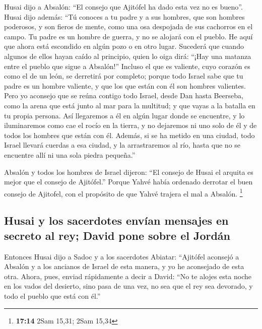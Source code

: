  Husai dijo a Absalón: ``El consejo que Ajitófel ha dado
esta vez no es bueno''.  Husai dijo además: ``Tú conoces a
tu padre y a sus hombres, que son hombres poderosos, y son fieros de
mente, como una osa despojada de sus cachorros en el campo. Tu padre es
un hombre de guerra, y no se alojará con el pueblo.  He
aquí que ahora está escondido en algún pozo o en otro lugar. Sucederá
que cuando algunos de ellos hayan caído al principio, quien lo oiga
dirá: ``¡Hay una matanza entre el pueblo que sigue a Absalón!''
 Incluso el que es valiente, cuyo corazón es como el de
un león, se derretirá por completo; porque todo Israel sabe que tu padre
es un hombre valiente, y que los que están con él son hombres valientes.
 Pero yo aconsejo que se reúna contigo todo Israel, desde
Dan hasta Beerseba, como la arena que está junto al mar para la
multitud; y que vayas a la batalla en tu propia persona. 
Así llegaremos a él en algún lugar donde se encuentre, y lo iluminaremos
como cae el rocío en la tierra, y no dejaremos ni uno solo de él y de
todos los hombres que están con él.  Además, si se ha
metido en una ciudad, todo Israel llevará cuerdas a esa ciudad, y la
arrastraremos al río, hasta que no se encuentre allí ni una sola piedra
pequeña.''

 Absalón y todos los hombres de Israel dijeron: ``El
consejo de Husai el arquita es mejor que el consejo de Ajitófel.''
Porque Yahvé había ordenado derrotar el buen consejo de Ajitofel, con el
propósito de que Yahvé trajera el mal a Absalón. \footnote{\textbf{17:14}
  2Sam 15,31; 2Sam 15,34}

\hypertarget{husai-y-los-sacerdotes-envuxedan-mensajes-en-secreto-al-rey-david-pone-sobre-el-jorduxe1n}{%
\subsection{Husai y los sacerdotes envían mensajes en secreto al rey;
David pone sobre el
Jordán}\label{husai-y-los-sacerdotes-envuxedan-mensajes-en-secreto-al-rey-david-pone-sobre-el-jorduxe1n}}

 Entonces Husai dijo a Sadoc y a los sacerdotes Abiatar:
``Ajitófel aconsejó a Absalón y a los ancianos de Israel de esta manera,
y yo he aconsejado de esta otra.  Ahora, pues, enviad
rápidamente a decir a David: ``No te alojes esta noche en los vados del
desierto, sino pasa de una vez, no sea que el rey sea devorado, y todo
el pueblo que está con él.''

